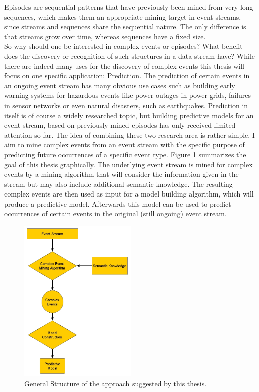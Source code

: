 Episodes are sequential patterns that have previously been mined from very long sequences, which makes them an appropriate mining target in event streams, since streams and sequences share the sequential nature. The only difference is that streams grow over time, whereas sequences have a fixed size.\\
So why should one be interested in complex events or episodes? What benefit does the discovery or recognition of such structures in a data stream have? While there are indeed many uses for the discovery of complex events this thesis will focus on one specific application: Prediction. The prediction of certain events in an ongoing event stream has many obvious use cases such as building early warning systems for hazardous events like power outages in power grids, failures in sensor networks or even natural disasters, such as earthquakes. Prediction in itself is of course a widely researched topic, but building predictive models for an event stream, based on previously mined episodes has only received limited attention so far.
The idea of combining these two research area is rather simple. I aim to mine complex events from an event stream with the specific purpose of predicting future occurrences of a specific event type. \newline
Figure \ref{fig_approach} summarizes the goal of this thesis graphically. The underlying event stream is mined for complex events by a mining algorithm that will consider the information given in the stream but may also include additional semantic knowledge. The resulting complex events are then used as input for a model building algorithm, which will produce a predictive model. Afterwards this model can be used to predict occurrences of certain events in the original (still ongoing) event stream.
\begin{figure}[h]
	\centering
  	\includegraphics[width=0.5\textwidth]{approach.jpg}
	\caption[Goal of this Thesis]{General Structure of the approach suggested by this thesis.}
	\label{fig_approach}
\end{figure}

